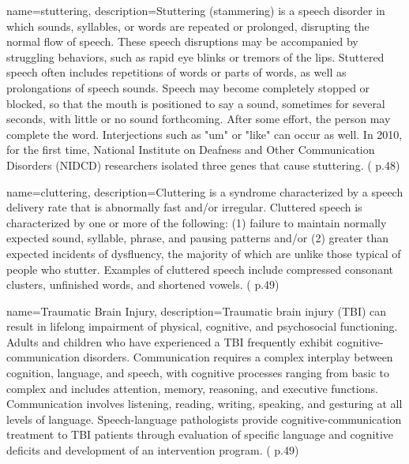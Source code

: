  {
	name={stuttering}, 
	description={Stuttering (stammering) is a speech disorder in which sounds, syllables, or words are repeated or prolonged, disrupting the normal flow of speech. These speech disruptions may be accompanied by struggling behaviors, such as rapid eye blinks or tremors of the lips. Stuttered speech often includes repetitions of words or parts of words, as well as prolongations of speech sounds. Speech may become completely stopped or blocked, so that the mouth is positioned to say a sound, sometimes for several seconds, with little or no sound forthcoming. After some effort, the person may complete the word. Interjections such as "um" or "like" can occur as well. In 2010, for the first time, National Institute on Deafness and Other Communication Disorders (NIDCD) researchers isolated three genes that cause stuttering. (\cite{SLPathologies} p.48)
}
}

 {
	name={cluttering}, 
	description={Cluttering is a syndrome characterized by a speech delivery rate that is abnormally fast and/or irregular. Cluttered speech is characterized by one or more of the following: (1) failure to maintain normally expected sound, syllable, phrase, and pausing patterns and/or (2) greater than expected incidents of dysfluency, the majority of which are unlike those typical of people who stutter. Examples of cluttered speech include compressed consonant clusters, unfinished words, and shortened vowels. (\cite{SLPathologies} p.49)
}
}

 {
	name={Traumatic Brain Injury}, 
	description={Traumatic brain injury (TBI) can result in lifelong impairment of physical, cognitive, and psychosocial functioning. Adults and children who have experienced a TBI frequently exhibit cognitive-communication disorders. Communication requires a complex interplay between cognition, language, and speech, with cognitive processes ranging from basic to complex and includes attention, memory, reasoning, and executive functions. Communication involves listening, reading, writing, speaking, and gesturing at all levels of language. Speech-language pathologists provide cognitive-communication treatment to TBI patients through evaluation of specific language and cognitive deficits and development of an intervention program. (\cite{SLPathologies} p.49)
}%
}

